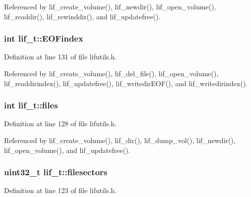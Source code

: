 Referenced by lif\+\_\+create\+\_\+volume(), lif\+\_\+newdir(), lif\+\_\+open\+\_\+volume(), lif\+\_\+readdir(), lif\+\_\+rewinddir(), and lif\+\_\+updatefree().

\subsubsection[{\texorpdfstring{E\+O\+Findex}{EOFindex}}]{\setlength{\rightskip}{0pt plus 5cm}int lif\+\_\+t\+::\+E\+O\+Findex}\hypertarget{structlif__t_a68c465a879c7d4bd2279682185b6250e}{}\label{structlif__t_a68c465a879c7d4bd2279682185b6250e}


Definition at line 131 of file lifutils.\+h.



Referenced by lif\+\_\+create\+\_\+volume(), lif\+\_\+del\+\_\+file(), lif\+\_\+open\+\_\+volume(), lif\+\_\+readdirindex(), lif\+\_\+updatefree(), lif\+\_\+writedir\+E\+O\+F(), and lif\+\_\+writedirindex().

\subsubsection[{\texorpdfstring{files}{files}}]{\setlength{\rightskip}{0pt plus 5cm}int lif\+\_\+t\+::files}\hypertarget{structlif__t_aceca398e2e3f6bcffe1593969544d546}{}\label{structlif__t_aceca398e2e3f6bcffe1593969544d546}


Definition at line 128 of file lifutils.\+h.



Referenced by lif\+\_\+create\+\_\+volume(), lif\+\_\+dir(), lif\+\_\+dump\+\_\+vol(), lif\+\_\+newdir(), lif\+\_\+open\+\_\+volume(), and lif\+\_\+updatefree().

\subsubsection[{\texorpdfstring{filesectors}{filesectors}}]{\setlength{\rightskip}{0pt plus 5cm}uint32\+\_\+t lif\+\_\+t\+::filesectors}\hypertarget{structlif__t_a1223702cce63f879654d51773243643d}{}\label{structlif__t_a1223702cce63f879654d51773243643d}


Definition at line 123 of file lifutils.\+h.



